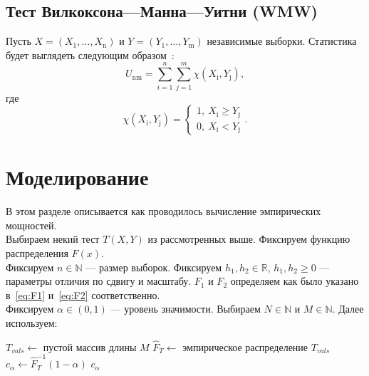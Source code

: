 \documentclass[12pt]{article}
\theoremstyle{break}
\begin{document}
\subsection{Тест Вилкоксона---Манна---Уитни (WMW)}
Пусть $X = (X_1, \ldots,X_{\mathrm{n}})$ и $Y = (Y_1, \ldots, Y_{\mathrm{m}})$ независимые выборки. Статистика будет выглядеть следующим образом~\cite{WMW_article}:
\begin{equation*}
	U_{\mathrm{nm}} = \sum_{i=1}^n \sum_{j=1}^m \chi(X_{\mathrm{i}},Y_{\mathrm{j}}),
\end{equation*}
где
\begin{equation*}
	\chi(X_{\mathrm{i}},Y_{\mathrm{j}}) = 
	\begin{cases}
		1, \ X_{\mathrm{i}} \geq Y_{\mathrm{j}} \\
		0, \ X_{\mathrm{i}} < Y_{\mathrm{j}}
	\end{cases}.
\end{equation*}


\newpage


\section{Моделирование}
В этом разделе описывается как проводилось вычисление эмпирических мощностей.\\[0.1in]
Выбираем некий тест $T(X,Y)$ из рассмотренных выше. Фиксируем функцию распределения $F(x)$.\\Фиксируем $n \in \mathbb{N}$ --- размер выборок. Фиксируем $h_1, h_2 \in \mathbb{R}$, $h_1, h_2 \geqslant 0$ --- параметры отличия по сдвигу и масштабу. $F_1$ и $F_2$ определяем как было указано в~\eqref{eq:F1} и~\eqref{eq:F2} соответственно.\\Фиксируем $\alpha \in (0,1)$ --- уровень значимости. Выбираем $N \in \mathbb{N}$ и $M \in \mathbb{N}$. Далее используем:

\vspace{0.3in}

\begin{algorithm}[H]
	\caption{Оценка критического значения $c_{\alpha}$}
	
	$T_{vals} \leftarrow$ пустой массив длины $M$\;
	$\hat{F}_T \leftarrow$ эмпирическое распределение $T_{vals}$\;
	$c_{\alpha} \leftarrow \hat{F}_T^{-1}(1-\alpha)$\;
	\Return $c_{\alpha}$\;
\label{alg:crit_val}
\end{algorithm}
\end{document}
